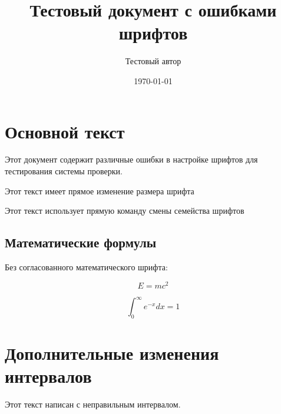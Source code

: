 \documentclass[10pt]{article} %
\title{Тестовый документ с ошибками шрифтов}
\author{Тестовый автор}
\date{\today}
\begin{document}
\maketitle

\section{Основной текст}

Этот документ содержит различные ошибки в настройке шрифтов для тестирования системы проверки.

{\fontsize{14}{16}\selectfont Этот текст имеет прямое изменение размера шрифта} %

{\selectfont Этот текст использует прямую команду смены семейства шрифтов} %

\subsection{Математические формулы}

Без согласованного математического шрифта:

$$E = mc^2$$

$$\int_{0}^{\infty} e^{-x} dx = 1$$

\section{Дополнительные изменения интервалов}


Этот текст написан с неправильным интервалом.
\end{document}
